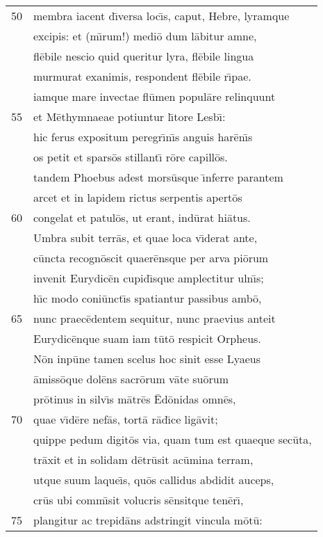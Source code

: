 \documentclass[paper=6in:9in,pagesize=pdftex,
               headinclude=on,footinclude=on,12pt]{scrbook}
\begin{document}
\begin{longtable}[p]{ r l }
50 & membra iacent d\={\i}versa loc\={\i}s, caput, Hebre, lyramque\\ 
 & excipis: et (m\={\i}rum!) medi\=o dum l\=abitur amne,\\ 
 & fl\=ebile nescio quid queritur lyra, fl\=ebile lingua\\ 
 & murmurat exanimis, respondent fl\=ebile r\={\i}pae.\\ 
 & iamque mare invectae fl\=umen popul\=are relinquunt\\ 
55 & et M\=ethymnaeae potiuntur l\={\i}tore Lesb\={\i}:\\ 
 & hic ferus expositum peregr\={\i}n\={\i}s anguis har\=en\={\i}s\\ 
 & os petit et spars\=os stillant\={\i} r\=ore capill\=os.\\ 
 & tandem Phoebus adest mors\=usque \={\i}nferre parantem\\ 
 & arcet et in lapidem rictus serpentis apert\=os\\ 
60 & congelat et patul\=os, ut erant, ind\=urat hi\=atus.\\ 
 & \indent Umbra subit terr\=as, et quae loca v\={\i}derat ante,\\ 
 & c\=uncta recogn\=oscit quaer\=ensque per arva pi\=orum\\ 
 & invenit Eurydic\=en cupid\={\i}sque amplectitur uln\={\i}s;\\ 
 & h\={\i}c modo coni\=unct\={\i}s spatiantur passibus amb\=o,\\ 
65 & nunc praec\=edentem sequitur, nunc praevius anteit\\ 
 & Eurydic\=enque suam iam t\=ut\=o respicit Orpheus.\\ 
 & \indent N\=on inp\=une tamen scelus hoc sinit esse Lyaeus\\ 
 & \=amiss\=oque dol\=ens sacr\=orum v\=ate su\=orum\\ 
 & pr\=otinus in silv\={\i}s m\=atr\=es \=Ed\=onidas omn\=es,\\ 
70 & quae v\={\i}d\=ere nef\=as, tort\=a r\=ad\={\i}ce lig\=avit;\\ 
 & quippe pedum digit\=os via, quam tum est quaeque sec\=uta,\\ 
 & tr\=axit et in solidam d\=etr\=usit ac\=umina terram,\\ 
 & utque suum laque\={\i}s, qu\=os callidus abdidit auceps,\\ 
 & cr\=us ubi comm\={\i}sit volucris s\=ensitque ten\=er\={\i},\\ 
75 & plangitur ac trepid\=ans adstringit vincula m\=ot\=u:\\ 

\end{longtable}
\end{document}
